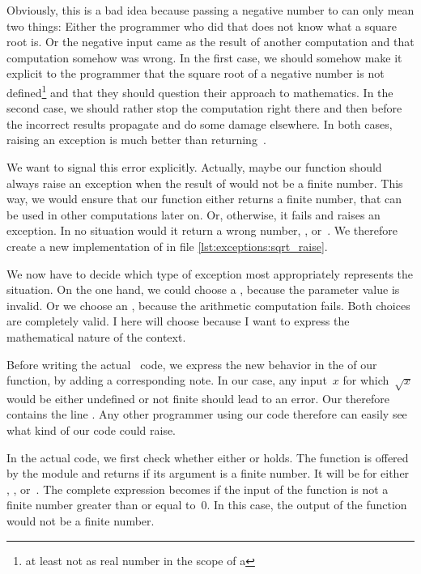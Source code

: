 Obviously, this is a bad idea because passing a negative number to  can only mean two things:
Either the programmer who did that does not know what a square root is.
Or the negative input came as the result of another computation and that computation somehow was wrong.
In the first case, we should somehow make it explicit to the programmer that the square root of a negative number is not defined\footnote{at least not as real number in the scope of a } and that they should question their approach to mathematics.
In the second case, we should rather stop the computation right there and then before the incorrect results propagate and do some damage elsewhere.
In both cases, raising an exception is much better than returning~.

We want to signal this error explicitly.
Actually, maybe our function should always raise an exception when the result of  would not be a finite number.
This way, we would ensure that our function either returns a finite number, that can be used in other computations later on.
Or, otherwise, it fails and raises an exception.
In no situation would it return a wrong number, , or~.
We therefore create a new implementation of  in file  \cref{lst:exceptions:sqrt_raise}.

We now have to decide which type of exception most appropriately represents the situation.
On the one hand, we could choose a , because the parameter value is invalid.
Or we choose an , because the arithmetic computation fails.
Both choices are completely valid.
I here will choose  because I want to express the mathematical nature of the context.

Before writing the actual \python\ code, we express the new behavior in the  of our function, by adding a corresponding  note.
In our case, any input~$x$ for which~$\sqrt{x}$ would be either undefined or not finite should lead to an error.
Our  therefore contains the line .
Any other programmer using our code therefore can easily see what kind of  our code could raise.

In the actual code, we first check whether either  or  holds.
The  function is offered by the  module and returns  if its argument is a finite number.
It will be  for either , , or~.
The complete expression becomes  if the input of the function is not a finite number greater than or equal to~0.
In this case, the output of the  function would not be a finite number.

